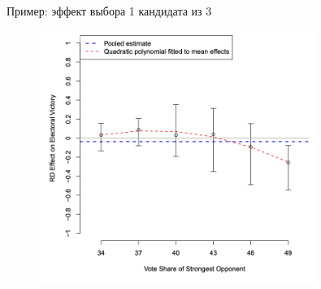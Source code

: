 \begin{frame}{Пример: эффект выбора 1 кандидата из 3 \parencite{cattaneo2016interpreting}}
    \begin{figure}
        \centering
        \includegraphics[width=0.8\textwidth]{Images/rdd_incumbancy_3.png}
    \end{figure}
\end{frame}












